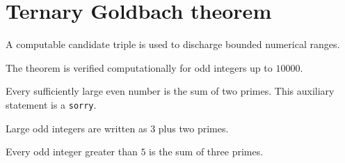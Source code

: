 \section{Ternary Goldbach theorem}

\begin{definition}
\label{def:tg-triple}
\leanok
A computable candidate triple is used to discharge bounded numerical ranges.
\end{definition}

\begin{lemma}
\label{lem:tg-small}
\leanok
{}
The theorem is verified computationally for odd integers up to $10000$.
\end{lemma}

\begin{lemma}
\label{lem:tg-binary}
\notready
Every sufficiently large even number is the sum of two primes. This auxiliary statement is a \texttt{sorry}.
\end{lemma}

\begin{lemma}
\label{lem:tg-large}
\notready
{}
Large odd integers are written as $3$ plus two primes.
\end{lemma}

\begin{theorem}
\label{thm:ternary-goldbach}
\notready
{}
Every odd integer greater than $5$ is the sum of three primes.
\end{theorem}
